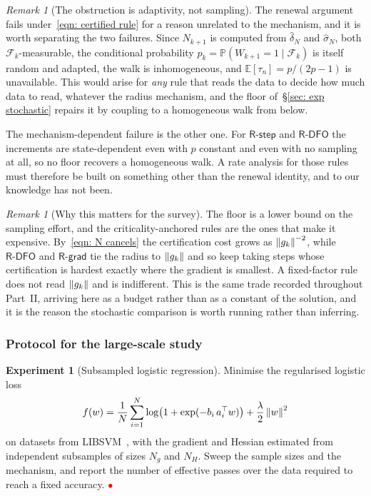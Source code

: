 \documentclass[11pt]{article}
\theoremstyle{plain}
\theoremstyle{definition}
\newtheorem{experiment}{Experiment}
\theoremstyle{remark}
\newtheorem{remark}[theorem]{Remark}
\numberwithin{equation}{section}
\newcommand{\Rstep}{\textsf{R-step}}
\newcommand{\Rdfo}{\textsf{R-DFO}}
\newcommand{\Rgrad}{\textsf{R-grad}}
\newcommand{\placeholder}{\textcolor{red}{$\bullet$}}
\providecommand{\E}{\mathbb{E}}
\providecommand{\Prob}{\mathbb{P}}
\providecommand{\calF}{\mathcal{F}}
\begin{document}
\begin{remark}[The obstruction is adaptivity, not sampling]
\label{rem: adaptivity obstruction}
  The renewal argument fails under~\eqref{eqn: certified rule} for a reason unrelated to the
  mechanism, and it is worth separating the two failures. Since $N_{k+1}$ is computed from
  $\hat\delta_N$ and $\hat\sigma_N$, both $\calF_k$-measurable, the conditional probability
  $p_k = \Prob(W_{k+1} = 1 \mid \calF_k)$ is itself random and adapted, the walk is inhomogeneous,
  and $\E[\tau_n] = p/(2p-1)$ is unavailable. This would arise for \emph{any} rule that reads the
  data to decide how much data to read, whatever the radius mechanism, and the floor
  of~\S\ref{sec: exp stochastic} repairs it by coupling to a homogeneous walk from below.

  The mechanism-dependent failure is the other one. For $\Rstep$ and $\Rdfo$ the increments are
  state-dependent even with $p$ constant and even with no sampling at all, so no floor recovers a
  homogeneous walk. A rate analysis for those rules must therefore be built on something other
  than the renewal identity, and to our knowledge has not been.
\end{remark}

\begin{remark}[Why this matters for the survey]
\label{rem: stochastic and anchoring}
  The floor is a lower bound on the sampling effort, and the criticality-anchored rules are the
  ones that make it expensive. By~\eqref{eqn: N cancels} the certification cost grows as
  $\left \lVert g_k \right \rVert^{-2}$, while $\Rdfo$ and $\Rgrad$ tie the radius to $\left \lVert g_k \right \rVert$ and so keep taking
  steps whose certification is hardest exactly where the gradient is smallest. A fixed-factor
  rule does not read $\left \lVert g_k \right \rVert$ and is indifferent. This is the same trade recorded throughout
  Part~II, arriving here as a budget rather than as a constant of the solution, and it is the
  reason the stochastic comparison is worth running rather than inferring.
\end{remark}

\subsubsection{Protocol for the large-scale study}

\begin{experiment}[Subsampled logistic regression]
\label{exp: stochastic}
Minimise the regularised logistic loss
\begin{equation}
  f(w) = \frac{1}{N}\sum_{i=1}^{N}
    \log\bigl(1 + \exp(-b_i\, a_i^\top w)\bigr) + \frac{\lambda}{2}\left \lVert w \right \rVert^2
  \label{eqn: logistic}
\end{equation}
on datasets from LIBSVM~\citep{ChangLin11}, with the gradient and Hessian estimated from
independent subsamples of sizes $N_g$ and $N_H$. Sweep the sample sizes and the mechanism, and
report the number of effective passes over the data required to reach a fixed accuracy.
\placeholder
\end{experiment}
\end{document}
